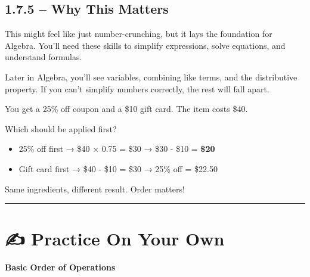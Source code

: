 \documentclass[
  letterpaper,
  DIV=11,
  numbers=noendperiod]{scrreprt}
\providecommand{\tightlist}{%
  \setlength{\itemsep}{0pt}\setlength{\parskip}{0pt}}
\begin{document}
\subsection*{1.7.5 -- Why This Matters}\label{why-this-matters}

This might feel like just number-crunching, but it lays the foundation
for Algebra. You'll need these skills to simplify expressions, solve
equations, and understand formulas.

Later in Algebra, you'll see variables, combining like terms, and the
distributive property. If you can't simplify numbers correctly, the rest
will fall apart.

You get a 25\% off coupon and a \$10 gift card. The item costs \$40.

Which should be applied first?

\begin{itemize}
\tightlist
\item
  25\% off first → \$40 × 0.75 = \$30 → \$30 - \$10 = \textbf{\$20}
\item
  Gift card first → \$40 - \$10 = \$30 → 25\% off = \$22.50
\end{itemize}

Same ingredients, different result. Order matters!

\begin{center}\rule{0.5\linewidth}{0.5pt}\end{center}

\section*{✍️ Practice On Your Own}\label{practice-on-your-own-6}


\textbf{Basic Order of Operations}
\end{document}
